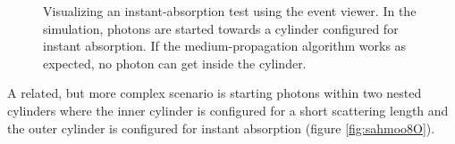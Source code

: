 \begin{figure}[htbp]
  \hfill
  \caption{Visualizing an instant-absorption test using the \steamshovel event viewer. In the simulation, photons are started towards a cylinder configured for instant absorption. If the medium-propagation algorithm works as expected, no photon can get inside the cylinder.}
  \label{fig:moo9Eiqu}
\end{figure}

A related, but more complex scenario is starting photons within two nested cylinders where the inner cylinder is configured for a short scattering length and the outer cylinder is configured for instant absorption (figure \ref{fig:sahmoo8O}).


